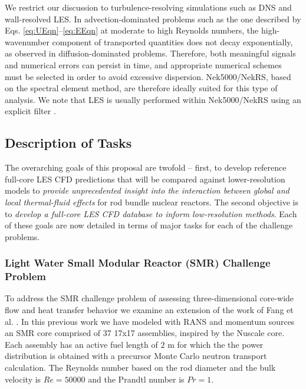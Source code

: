 We restrict our discussion to turbulence-resolving simulations such as DNS and
wall-resolved LES. In advection-dominated problems such as the
one described by Eqs. \ref{eq:UEqn}--\ref{eq:EEqn} at moderate to high Reynolds numbers,
the high-wavenumber component of transported quantities does not decay
exponentially, as observed in diffusion-dominated problems. Therefore, both
meaningful signals and numerical errors can persist in time, and appropriate
numerical schemes must be selected in order to avoid excessive dispersion.
Nek5000/NekRS, based on the spectral element method, are therefore ideally suited for this
type of analysis. We note that LES is usually performed within Nek5000/NekRS using an explicit filter \cite{schlatter21}.

\vspace{-.25in}
\subsection{Description of Tasks}
\label{sec:tasks}
\vspace{-.2in}


The overarching goals of this proposal are twofold -- first, to develop
reference full-core LES CFD predictions that will be compared against
lower-resolution models to {\it provide unprecedented insight into the interaction
between global and local thermal-fluid effects} for rod bundle nuclear reactors. The second
objective is to {\it develop a full-core LES CFD database to inform low-resolution methods}. Each of these
goals are now detailed in terms of major tasks for each of the challenge
problems.

\vspace{-.25in}
\subsubsection{Light Water Small Modular Reactor (SMR) Challenge Problem}
\vspace{-.2in}

To address the SMR challenge problem of assessing three-dimensional core-wide flow and heat transfer behavior we examine an extension of the work of Fang et al. \cite{Fang2021}.
In this previous work we have modeled with RANS and momentum sources an SMR core comprised of 37 17x17 assemblies, inspired by the Nuscale core. Each assembly has an active fuel length of $2$ m for which the the power distribution is obtained with a precursor Monte Carlo neutron transport calculation. The Reynolds number based on the rod diameter and the bulk velocity is $Re=50000$ and the Prandtl number is $Pr=1$.

